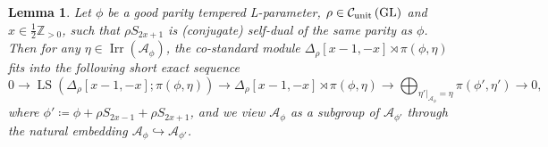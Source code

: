 \documentclass[11pt,letterpaper]{amsart}
\theoremstyle{plain}
\newcounter{theorem}[section]
\numberwithin{theorem}{section}
\numberwithin{equation}{subsection}
\newtheorem{Lem}[theorem]{Lemma}
\theoremstyle{remark}
\newcommand{\GL}{\operatorname{GL}}
\newcommand{\Irr}{\operatorname{Irr}}
\newcommand{\LS}{\operatorname{LS}} %
\newcommand{\Z}{\mathbb{Z}}
\newcommand{\unit}{{\rm unit}}
\def\calA{\mathcal{A}}
\def\calC{\mathcal{C}}
\def\lra{\longrightarrow}
\begin{document}
\begin{Lem}\label{L:non-unitaryInd-0}
Let $\phi$ be a good parity tempered L-parameter, $\rho\in\calC_{\unit}\left(\GL\right)$ and $x\in\frac{1}{2}\Z_{> 0}$, such that $\rho S_{2x+1}$ is (conjugate) self-dual of the same parity as $\phi$. Then for any $\eta\in\Irr\left(\calA_\phi\right)$, the co-standard module $\Delta_\rho\left[x-1,-x\right] \rtimes \pi\left(\phi,\eta\right)$ fits into the following short exact sequence
\[
    0 \lra \LS\left(\Delta_\rho\left[x-1,-x\right];\pi\left(\phi,\eta\right)\right) \lra \Delta_\rho\left[x-1,-x\right] \rtimes \pi\left(\phi,\eta\right) \lra \bigoplus_{\eta'|_{\calA_\phi}=\eta}\pi\left(\phi',\eta'\right) \lra 0,
\]
where $\phi'\coloneqq \phi + \rho S_{2x-1} + \rho S_{2x+1}$, and we view $\calA_\phi$ as a subgroup of $\calA_{\phi'}$ through the natural embedding $\calA_\phi\hookrightarrow\calA_{\phi'}$.
\end{Lem}

\vskip 5pt
\end{document}
